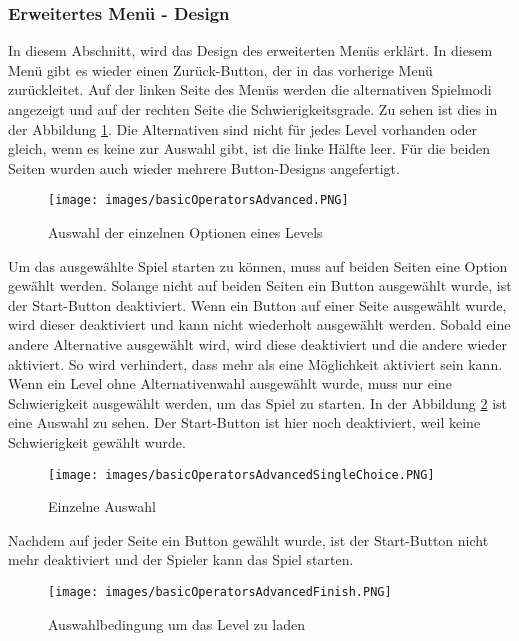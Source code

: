 \subsubsection{Erweitertes Menü - Design}
In diesem Abschnitt, wird das Design des erweiterten Menüs erklärt. In diesem Menü gibt es wieder einen Zurück-Button, der in das vorherige Menü zurückleitet. Auf der linken Seite des Menüs werden die alternativen Spielmodi angezeigt und auf der rechten Seite die Schwierigkeitsgrade. Zu sehen ist dies in der Abbildung \ref{AdvancedMenü}. Die Alternativen sind nicht für jedes Level vorhanden oder gleich, wenn es keine zur Auswahl gibt, ist die linke Hälfte leer. Für die beiden Seiten wurden auch wieder mehrere Button-Designs angefertigt.
\begin{figure}[htbp]
  \centering
  \texttt{[image: images/basicOperatorsAdvanced.PNG]}
  \caption{Auswahl der einzelnen Optionen eines Levels}
  \label{AdvancedMenü}
\end{figure}
Um das ausgewählte Spiel starten zu können, muss auf beiden Seiten eine Option gewählt werden. Solange nicht auf beiden Seiten ein Button ausgewählt wurde, ist der Start-Button deaktiviert. Wenn ein Button auf einer Seite ausgewählt wurde, wird dieser deaktiviert und kann nicht wiederholt ausgewählt werden. Sobald eine andere Alternative ausgewählt wird, wird diese deaktiviert und die andere wieder aktiviert. So wird verhindert, dass mehr als eine Möglichkeit aktiviert sein kann. Wenn ein Level ohne Alternativenwahl ausgewählt wurde, muss nur eine Schwierigkeit ausgewählt werden, um das Spiel zu starten. In der Abbildung \ref{singleChoice} ist eine Auswahl zu sehen. Der Start-Button ist hier noch deaktiviert, weil keine Schwierigkeit gewählt wurde. 
\begin{figure}[htbp]
  \centering
  \texttt{[image: images/basicOperatorsAdvancedSingleChoice.PNG]}
  \caption{Einzelne Auswahl}
  \label{singleChoice}
\end{figure}
Nachdem auf jeder Seite ein Button gewählt wurde, ist der Start-Button nicht mehr deaktiviert und der Spieler kann das Spiel starten.
\begin{figure}[htbp]
  \centering
  \texttt{[image: images/basicOperatorsAdvancedFinish.PNG]}
  \caption{Auswahlbedingung um das Level zu laden}
  \label{startLevel}
\end{figure}
